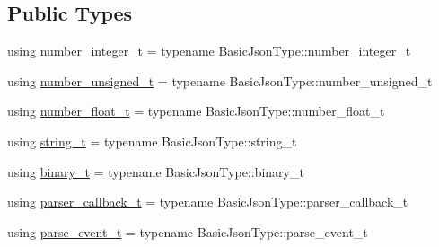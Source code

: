 \subsection*{Public Types}
\begin{DoxyCompactItemize}
\item 
using \hyperlink{classnlohmann_1_1detail_1_1json__sax__dom__callback__parser_a3ba8fc7a8d83c5b0eeb3b543ad844b8d}{number\+\_\+integer\+\_\+t} = typename Basic\+Json\+Type\+::number\+\_\+integer\+\_\+t
\item 
using \hyperlink{classnlohmann_1_1detail_1_1json__sax__dom__callback__parser_a2406c5125f7128fb9c01921df2903001}{number\+\_\+unsigned\+\_\+t} = typename Basic\+Json\+Type\+::number\+\_\+unsigned\+\_\+t
\item 
using \hyperlink{classnlohmann_1_1detail_1_1json__sax__dom__callback__parser_a914ea0555cea5290449fb791ae41c655}{number\+\_\+float\+\_\+t} = typename Basic\+Json\+Type\+::number\+\_\+float\+\_\+t
\item 
using \hyperlink{classnlohmann_1_1detail_1_1json__sax__dom__callback__parser_a00e7d95d82d5d8a43421526a42a8eabc}{string\+\_\+t} = typename Basic\+Json\+Type\+::string\+\_\+t
\item 
using \hyperlink{classnlohmann_1_1detail_1_1json__sax__dom__callback__parser_a5af8493f830eeb1a79c69fc39ed54ef8}{binary\+\_\+t} = typename Basic\+Json\+Type\+::binary\+\_\+t
\item 
using \hyperlink{classnlohmann_1_1detail_1_1json__sax__dom__callback__parser_a4f636086fa8e7cf26c35c8afd50903ce}{parser\+\_\+callback\+\_\+t} = typename Basic\+Json\+Type\+::parser\+\_\+callback\+\_\+t
\item 
using \hyperlink{classnlohmann_1_1detail_1_1json__sax__dom__callback__parser_aac6d706967b2ecc2510e172577d8550b}{parse\+\_\+event\+\_\+t} = typename Basic\+Json\+Type\+::parse\+\_\+event\+\_\+t
\end{DoxyCompactItemize}
